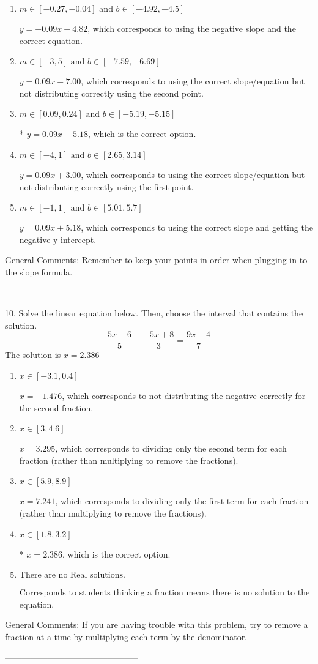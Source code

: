 \documentclass{article}[14pt]
\begin{document}
\begin{enumerate}[label=\Alph*.] 
\item $ m \in [-0.27, -0.04] \text{ and } b \in [-4.92, -4.5] $ 

  $y = -0.09x - 4.82$, which corresponds to using the negative slope and the correct equation. 
\item $ m \in [-3, 5] \text{ and } b \in [-7.59, -6.69] $ 

  $y = 0.09x - 7.00$, which corresponds to using the correct slope/equation but not distributing correctly using the second point. 
\item $ m \in [0.09, 0.24] \text{ and } b \in [-5.19, -5.15] $ 

 * $y = 0.09x - 5.18$, which is the correct option. 
\item $ m \in [-4, 1] \text{ and } b \in [2.65, 3.14] $ 

  $y = 0.09x + 3.00$, which corresponds to using the correct slope/equation but not distributing correctly using the first point. 
\item $ m \in [-1, 1] \text{ and } b \in [5.01, 5.7] $ 

  $y = 0.09x + 5.18$, which corresponds to using the correct slope and getting the negative y-intercept. 
\end{enumerate} 
 
General Comments: Remember to keep your points in order when plugging in to the slope formula.

-----------------------------------------------

10. Solve the linear equation below. Then, choose the interval that contains the solution.
$$ \frac{5 x - 6}{5} - \frac{-5 x + 8}{3} = \frac{9 x - 4}{7} $$ 
The solution is $ x = 2.386 $ 

\begin{enumerate}[label=\Alph*.] 
\item $ x \in [-3.1, 0.4] $ 

  $x = -1.476$, which corresponds to not distributing the negative correctly for the second fraction. 
\item $ x \in [3, 4.6] $ 

  $x = 3.295$, which corresponds to dividing only the second term for each fraction (rather than multiplying to remove the fractions). 
\item $ x \in [5.9, 8.9] $ 

  $x = 7.241$, which corresponds to dividing only the first term for each fraction (rather than multiplying to remove the fractions). 
\item $ x \in [1.8, 3.2] $ 

 * $x = 2.386$, which is the correct option. 
\item $ \text{There are no Real solutions.} $ 

 Corresponds to students thinking a fraction means there is no solution to the equation. 
\end{enumerate} 
 
General Comments: If you are having trouble with this problem, try to remove a fraction at a time by multiplying each term by the denominator.

-----------------------------------------------
\end{document}
